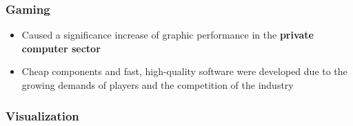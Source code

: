 \documentclass{standalone}
\begin{document}
\subsubsection{Gaming}
\begin{itemize}
	\item Caused a significance increase of graphic performance in the \textbf{private computer sector}
	\item Cheap components and fast, high-quality software were developed due to the growing demands of players and the competition of the industry
\end{itemize}

\subsubsection{Visualization}
\end{document}
